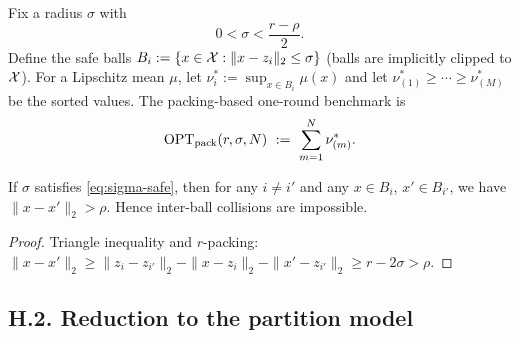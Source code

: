 Fix a radius $\sigma$ with
\begin{equation}
\label{eq:sigma-safe}
0<\sigma<\frac{r-\rho}{2}.
\end{equation}
Define the  {safe balls} $B_i:=\{x\in\mathcal{X}:\|x-z_i\|_2\le\sigma\}$ (balls are implicitly clipped to $\mathcal{X}$). For a Lipschitz mean $\mu$, let $\nu_i^\ast:=\sup_{x\in B_i}\mu(x)$ and let $\nu_{(1)}^\ast\ge\cdots\ge \nu_{(M)}^\ast$ be the sorted values. The packing-based one-round benchmark is
\[
\mathrm{OPT}_{\mathrm{pack}}(r,\sigma,N)\ :=\ \sum_{m=1}^N \nu_{(m)}^\ast.
\]

\begin{lemma}
\label{lem:packing-safety}
If $\sigma$ satisfies \eqref{eq:sigma-safe}, then for any $i\ne i'$ and any $x\in B_i$, $x'\in B_{i'}$, we have $\|x-x'\|_2>\rho$. Hence inter-ball collisions are impossible.
\end{lemma}

\begin{proof}
Triangle inequality and $r$-packing: $\|x-x'\|_2 \ge \|z_i-z_{i'}\|_2-\|x-z_i\|_2-\|x'-z_{i'}\|_2 \ge r-2\sigma>\rho$.
\end{proof}

\subsection*{H.2.\; Reduction to the partition model}

